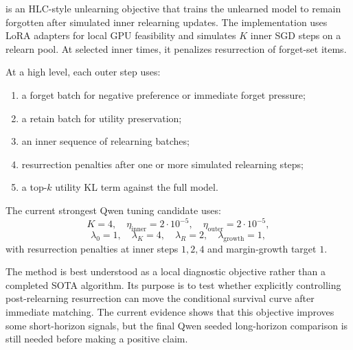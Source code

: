 \method{} is an HLC-style unlearning objective that trains the unlearned model to remain forgotten after simulated inner relearning updates.
The implementation uses LoRA adapters for local GPU feasibility and simulates $K$ inner SGD steps on a relearn pool.
At selected inner times, it penalizes resurrection of forget-set items.

At a high level, each outer step uses:

\begin{enumerate}[leftmargin=*]
  \item a forget batch for negative preference or immediate forget pressure;
  \item a retain batch for utility preservation;
  \item an inner sequence of relearning batches;
  \item resurrection penalties after one or more simulated relearning steps;
  \item a top-$k$ utility KL term against the full model.
\end{enumerate}

The current strongest Qwen tuning candidate uses:
\[
K=4,\quad \eta_{\mathrm{inner}}=2\cdot 10^{-5},\quad
\eta_{\mathrm{outer}}=2\cdot 10^{-5},
\]
\[
\lambda_0=1,\quad \lambda_K=4,\quad \lambda_R=2,\quad
\lambda_{\mathrm{growth}}=1,
\]
with resurrection penalties at inner steps $1,2,4$ and margin-growth target $1$.

The method is best understood as a local diagnostic objective rather than a completed SOTA algorithm.
Its purpose is to test whether explicitly controlling post-relearning resurrection can move the conditional survival curve after immediate matching.
The current evidence shows that this objective improves some short-horizon signals, but the final Qwen seeded long-horizon comparison is still needed before making a positive claim.
